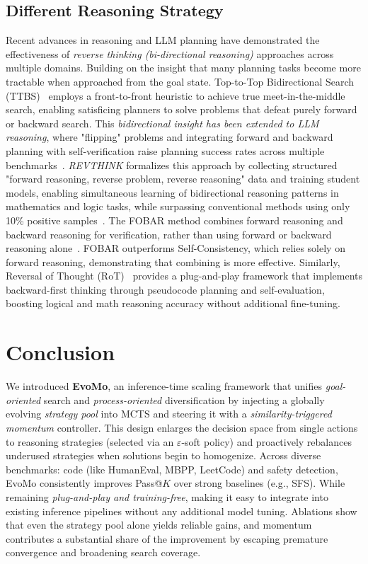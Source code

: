\documentclass{article} %
\theoremstyle{definition}
\theoremstyle{remark}
\begin{document}
\subsection{Different Reasoning Strategy}
Recent advances in reasoning and LLM planning have demonstrated the effectiveness of \textit{reverse thinking (bi-directional reasoning)} approaches across multiple domains.
Building on the insight that many planning tasks become more tractable when approached from the goal state. Top-to-Top Bidirectional Search (TTBS)~\citep{kuroiwa2020front} employs a front-to-front heuristic to achieve true meet-in-the-middle search, enabling satisficing planners to solve problems that defeat purely forward or backward search. This \textit{bidirectional insight has been extended to LLM reasoning}, where "flipping" problems and integrating forward and backward planning with self-verification raise planning success rates across multiple benchmarks~\citep{ren2024thinking}. \textit{REVTHINK} formalizes this approach by collecting structured "forward reasoning, reverse problem, reverse reasoning" data and training student models, enabling simultaneous learning of bidirectional reasoning patterns in
mathematics and logic tasks, while surpassing conventional methods using only 10\% positive samples~\citep{chen2024reverse}. The FOBAR method combines forward reasoning and backward reasoning for verification, rather than using forward or backward reasoning alone~\citep{jiang2024forward}. FOBAR outperforms Self-Consistency, which relies solely on forward reasoning, demonstrating that combining is more effective. Similarly, Reversal of Thought (RoT)~\citep{yuan-etal-2025-reversal} provides a plug-and-play framework that implements backward-first thinking through pseudocode planning and self-evaluation, boosting logical and math reasoning accuracy without additional fine-tuning. 



\section{Conclusion}
We introduced \textbf{EvoMo}, an inference-time scaling framework that unifies \emph{goal-oriented} search and \emph{process-oriented} diversification by injecting a globally evolving \emph{strategy pool} into MCTS and steering it with a \emph{similarity-triggered momentum} controller. This design enlarges the decision space from single actions to reasoning strategies (selected via an $\varepsilon$-soft policy) and proactively rebalances underused strategies when solutions begin to homogenize. Across diverse benchmarks: code (like HumanEval, MBPP, LeetCode) and safety detection, EvoMo consistently improves Pass@\!$K$ over strong baselines (e.g., SFS). While remaining \emph{plug-and-play and training-free}, making it easy to integrate into existing inference pipelines without any additional model tuning. Ablations show that even the strategy pool alone yields reliable gains, and momentum contributes a substantial share of the improvement by escaping premature convergence and broadening search coverage. 
\end{document}
